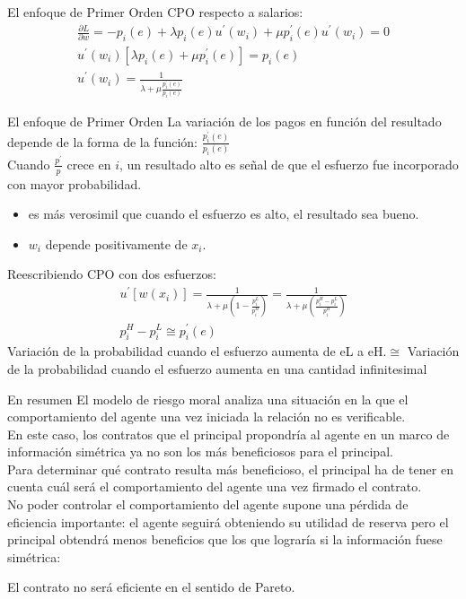 \begin{frame}{El enfoque de Primer Orden}
	CPO respecto a salarios:
		\begin{gather*}
			\frac{\partial L}{\partial w} = -p_i(e)+\lambda p_i(e)u^\prime(w_i) + \mu p_{i}^{\prime}(e)u^{\prime}(w_i) = 0\\[0.3cm]
			u^{\prime}(w_i)\left[\lambda p_i(e) + \mu p_{i}^{\prime}(e) \right]  = p_{i}(e)\\[0.3cm]
			u^{\prime}(w_i) = \frac{1}{\lambda + \mu \frac{p_{i}^{\prime}(e)}{p_{i}(e)}}
		\end{gather*}
\end{frame}
\begin{frame}{El enfoque de Primer Orden}
	La variación de los pagos en función del resultado depende de la forma de la función: $\frac{p_{i}^{\prime}(e)}{p_{i}(e)}$\\
	
	Cuando $\frac{p^\prime}{p}$ crece en $i$, un resultado alto es señal de que el esfuerzo fue incorporado con mayor probabilidad.\\
		\begin{itemize}
			\item es más verosimil que cuando el esfuerzo es alto, el resultado sea bueno.
			\item $w_i$ depende positivamente de $x_i$.
		\end{itemize}
	Reescribiendo CPO con dos esfuerzos:
		\begin{gather*}
				u^{\prime}\left[w \left(x_i \right) \right]  = \frac{1}{\lambda + \mu \left(1- \frac{p_{i}^L}{p_{i}^H}\right) } = \frac{1}{\lambda + \mu \left( \frac{p_{i}^H-p_{i}^L}{p_{i}^H}\right) }\\[0.3cm]
				p_{i}^H-p_{i}^L \cong p_{i}^{\prime}(e)
		\end{gather*}
	Variación de la probabilidad cuando el esfuerzo aumenta de eL a eH.$\cong$ Variación de la probabilidad cuando el esfuerzo aumenta en una cantidad infinitesimal
\end{frame}
\begin{frame}{En resumen}
	El modelo de riesgo moral analiza una situación en la que el comportamiento del agente una vez iniciada la relación no es verificable.\\[0.3cm]
	En este caso, los contratos que el principal propondría al agente en un marco de información simétrica ya no son los más beneficiosos para el principal.\\[0.3cm]
	Para determinar qué contrato resulta más beneficioso, el principal ha de tener en cuenta cuál será el comportamiento del agente una vez firmado el contrato.\\[0.3cm]
	No poder controlar el comportamiento del agente supone una pérdida de eficiencia importante: el agente seguirá obteniendo su utilidad de reserva pero el principal obtendrá menos beneficios que los que lograría si la información fuese simétrica:
	\begin{center}
		El contrato no será eficiente en el sentido de Pareto.
	\end{center}
\end{frame}
